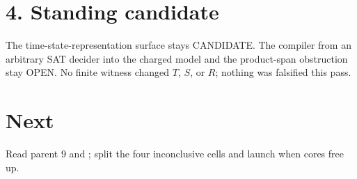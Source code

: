 \documentclass[11pt]{article}
\begin{document}
\section*{4. Standing candidate}
The time-state-representation surface stays CANDIDATE. The compiler from an arbitrary SAT decider into the charged model and the product-span obstruction stay OPEN. No finite witness changed $T$, $S$, or $R$; nothing was falsified this pass.

\section*{Next}
Read parent 9 and ; split the four inconclusive cells and launch  when cores free up.
\end{document}
